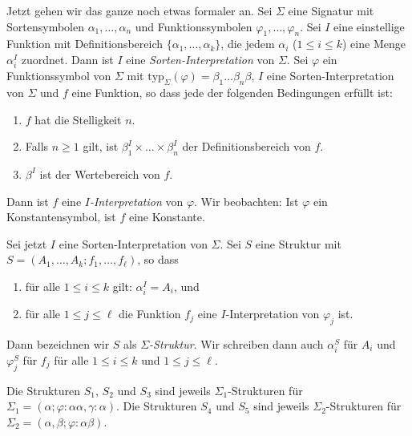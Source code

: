\documentclass{article}
\begin{document}
Jetzt gehen wir das ganze noch etwas formaler an. Sei $\Sigma$ eine Signatur 
mit Sortensymbolen $\alpha_1,\ldots,\alpha_n$ und Funktionssymbolen 
$\varphi_1,\ldots,\varphi_n$. Sei $I$ eine einstellige Funktion mit 
Definitionsbereich $\{\alpha_1,\ldots,\alpha_k\}$, die jedem $\alpha_i$ ($1\leq 
i\leq k$) eine Menge $\alpha_i^I$ zuordnet. Dann ist $I$ eine 
\emph{Sorten-Interpretation} von $\Sigma$. Sei $\varphi$ ein Funktionssymbol 
von $\Sigma$ mit $\mathrm{typ}_\Sigma(\varphi) = \beta_1\ldots \beta_n \beta$, 
$I$ eine Sorten-Interpretation von $\Sigma$ und $f$ eine Funktion, so dass jede 
der folgenden Bedingungen erfüllt ist:  
\begin{enumerate}
\item $f$ hat die Stelligkeit $n$. 
 \item Falls $n \geq 1$ gilt, ist $\beta_1^I\times \ldots \times 
\beta_n^I$ der Definitionsbereich von $f$.
\item $\beta^I$ ist der Wertebereich von $f$. 
\end{enumerate}
Dann ist $f$ eine \emph{$I$-Interpretation} von $\varphi$. Wir beobachten: Ist 
$\varphi$ ein Konstantensymbol, ist $f$ eine Konstante. 

Sei jetzt $I$ eine Sorten-Interpretation von $\Sigma$. Sei 
$S$ eine Struktur mit $S = 
(A_1,\ldots,A_k;f_1,\ldots,f_\ell)$, so dass 
\begin{enumerate}
 \item für alle $1\leq i\leq k$ gilt: $\alpha_i^I = A_i$, und 
 \item für alle $1\leq j\leq \ell$ die Funktion $f_j$ eine 
$I$-Interpretation von $\varphi_j$ ist. 
\end{enumerate}
Dann 
bezeichnen wir $S$ als \emph{$\Sigma$-Struktur}. Wir schreiben dann auch 
$\alpha_i^S$ für $A_i$ und $\varphi_j^S$ für $f_j$ für alle $1\leq i\leq k$ und 
$1\leq j\leq \ell$.

Die Strukturen 
$S_1$, $S_2$ und $S_3$ sind jeweils $\Sigma_1$-Strukturen für $\Sigma_1 =  
(\alpha;\varphi:\alpha\alpha,\gamma:\alpha)$. Die Strukturen $S_4$ und $S_5$ 
sind jeweils $\Sigma_2$-Strukturen für $\Sigma_2 = 
(\alpha,\beta;\varphi:\alpha\beta)$. 













 
\end{document}
